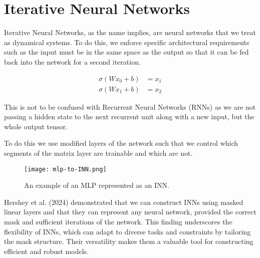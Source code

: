 \documentclass[sigconf]{acmart}
\begin{document}




\section{Iterative Neural Networks}

Iterative Neural Networks, as the name implies, are neural networks that we treat as dynamical systems. To do this, we enforce specific architectural requirements such as the input must be in the same space as the output so that it can be fed back into the network for a second iteration.

\begin{align*}
    \sigma (Wx_0 + b) &= x_1 \\
    \sigma (Wx_1 + b) &= x_2
\end{align*}

This is not to be confused with Recurrent Neural Networks (RNNs) as we are not passing a hidden state to the next recurrent unit along with a new input, but the whole output tensor.

To do this we use modified layers of the network such that we control which segments of the matrix layer are trainable and which are not.

\begin{figure}[h]
  \centering
  \texttt{[image: mlp-to-INN.png]}
  \caption{An example of an MLP represented as an INN.}
\end{figure}

Hershey et al. (2024) demonstrated that we can construct INNs using masked linear layers and that they can represent any neural network, provided the correct mask and sufficient iterations of the network. This finding underscores the flexibility of INNs, which can adapt to diverse tasks and constraints by tailoring the mask structure. Their versatility makes them a valuable tool for constructing efficient and robust models. \cite{hershey2024rethinking}
\end{document}
